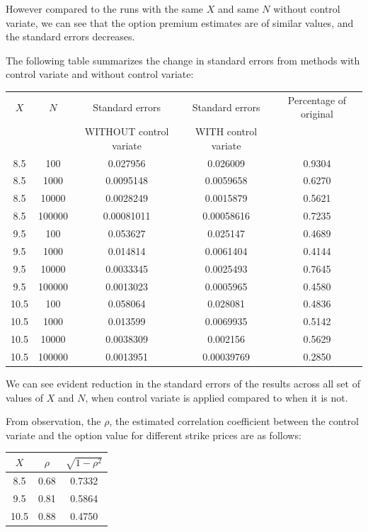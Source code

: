However compared to the runs with the same $X$ and same $N$ without control variate, we can see that the option premium estimates are of similar values, and the standard errors decreases. 

The following table summarizes the change in standard errors from methods with control variate and without control variate:

\begin{center}
	\begin{tabular}{| c | c | c | c | c |}
		\hline $X$ & $N$ & Standard errors & Standard errors & Percentage of original\\ 
		           & &WITHOUT control variate  & WITH control variate &\\
		[0.5ex]
		\hline 8.5 & 100 & 0.027956 & 0.026009 & 0.9304\\
		\hline 8.5 & 1000 & 0.0095148 & 0.0059658 & 0.6270\\
		\hline 8.5 & 10000 & 0.0028249 & 0.0015879 & 0.5621\\
		\hline 8.5 & 100000 & 0.00081011 & 0.00058616 & 0.7235\\
		\hline
		\hline 9.5 & 100 & 0.053627 & 0.025147 & 0.4689\\
		\hline 9.5 & 1000 & 0.014814 & 0.0061404 & 0.4144\\
		\hline 9.5 & 10000 & 0.0033345 & 0.0025493 & 0.7645\\
		\hline 9.5 & 100000 & 0.0013023 & 0.0005965 & 0.4580\\
		\hline
		\hline 10.5 & 100 & 0.058064 & 0.028081 & 0.4836\\
		\hline 10.5 & 1000 & 0.013599 & 0.0069935 & 0.5142\\
		\hline 10.5 & 10000 & 0.0038309 & 0.002156 & 0.5629\\
		\hline 10.5 & 100000 & 0.0013951 & 0.00039769 & 0.2850\\
		\hline
	\end{tabular}
\end{center}
We can see evident reduction in the standard errors of the results across all set of values of $X$ and $N$, when control variate is applied compared to when it is not.

From observation, the $\rho$, the estimated correlation coefficient between  the control variate and the option value for different strike prices are as follows:
\begin{center}
	\begin{tabular}{|c|c|c|}
	\hline $X$ & $\rho$ & $\sqrt{1-\rho^2}$\\
	\hline 8.5 & 0.68 & 0.7332 \\
	\hline 9.5 & 0.81 & 0.5864 \\
	\hline 10.5 & 0.88 & 0.4750 \\
	\hline
	\end{tabular}
\end{center}

